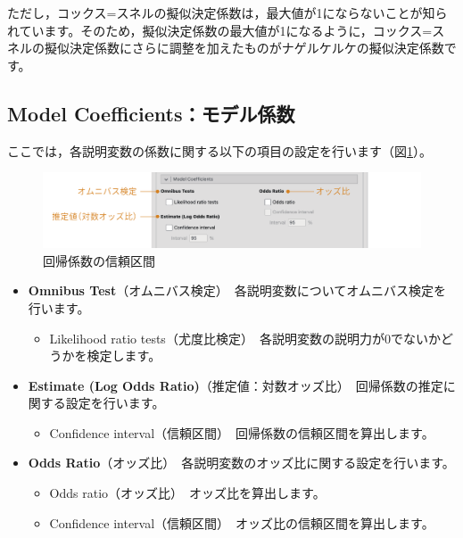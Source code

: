 \documentclass[
  12pt,
  a5jpaper,
  lualatex, ja=standard]{bxjsbook}
\providecommand{\tightlist}{%
  \setlength{\itemsep}{0pt}\setlength{\parskip}{0pt}}
\newenvironment{jmvsettings}{%
	\begin{center}%
	\begin{tcolorbox}[%
		title=設定項目,
		colframe=gmoji,
		colbacktitle=gmoji,
		colback=gmoji!2!white,
		breakable,
		width=.9\textwidth,
		]\small\addtolength{\leftmargini}{-3\labelsep}%
	}%
	{\end{tcolorbox}\end{center}}
\begin{document}
ただし，コックス=スネルの擬似決定係数は，最大値が1にならないことが知られています。そのため，擬似決定係数の最大値が1になるように，コックス=スネルの擬似決定係数にさらに調整を加えたものがナゲルケルケの擬似決定係数です。

\hypertarget{sub:regression-binomial-model-coeff}{%
\subsection{Model Coefficients：モデル係数}\label{sub:regression-binomial-model-coeff}}

ここでは，各説明変数の係数に関する以下の項目の設定を行います（図\ref{fig:regression-binomial-model-coefficients}）。

\begin{figure}[!ht]

{\centering \includegraphics[width=1\linewidth]{images/regression/binomial-model-coefficients} 

}

\caption{回帰係数の信頼区間}\label{fig:regression-binomial-model-coefficients}
\end{figure}

\begin{jmvsettings}

\begin{itemize}
\tightlist
\item
  \textbf{Omnibus Test}（オムニバス検定）　各説明変数についてオムニバス検定を行います。

  \begin{itemize}
  \tightlist
  \item
    Likelihood ratio tests（尤度比検定）　各説明変数の説明力が0でないかどうかを検定します。
  \end{itemize}
\item
  \textbf{Estimate (Log Odds Ratio)}（推定値：対数オッズ比）　回帰係数の推定に関する設定を行います。

  \begin{itemize}
  \tightlist
  \item
    Confidence interval（信頼区間）　回帰係数の信頼区間を算出します。
  \end{itemize}
\item
  \textbf{Odds Ratio}（オッズ比）　各説明変数のオッズ比に関する設定を行います。

  \begin{itemize}
  \tightlist
  \item
    Odds ratio（オッズ比）　オッズ比を算出します。
  \item
    Confidence interval（信頼区間）　オッズ比の信頼区間を算出します。
  \end{itemize}
\end{itemize}

\end{jmvsettings}
\end{document}
